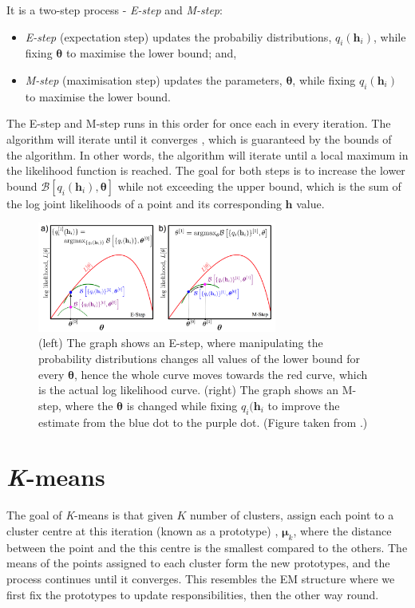 \documentclass[11pt,openright,a4paper]{article}
\numberwithin{equation}{section}
\begin{document}
It is a two-step process - \textit{E-step} and \textit{M-step}:
\begin{itemize}
    \item \textit{E-step} (expectation step) updates the probabiliy distributions, $q_{i}\left(\boldsymbol{h}_{i} \right)$, while fixing $\boldsymbol{\theta}$ to maximise the lower bound; and,
    \item \textit{M-step} (maximisation step) updates the parameters, $\boldsymbol{\theta}$, while fixing $q_{i}\left(\boldsymbol{h}_{i} \right)$ to maximise the lower bound. 
\end{itemize}

The E-step and M-step runs in this order for once each in every iteration. The algorithm will iterate until it converges , which is guaranteed by the bounds of the algorithm. In other words, the algorithm will iterate until a local maximum in the likelihood function is reached. The goal for both steps is to increase the lower bound $\mathcal{B}\left[q_{i}\left(\boldsymbol{h}_i\right),\boldsymbol{\theta} \right]$ while not exceeding the upper bound, which is the sum of the log joint likelihoods of a point and its corresponding $\boldsymbol{h}$ value. 


\begin{figure}[H]
  \centering
  \includegraphics[width=0.7\textwidth]{em-overview}
    \caption{(left) The graph shows an E-step, where manipulating the probability distributions changes all values of the lower bound for every $\boldsymbol{\theta}$, hence the whole curve moves towards the red curve, which is the actual log likelihood curve. (right) The graph shows an M-step, where the $\boldsymbol{\theta}$ is changed while fixing $q_{i}(\boldsymbol{h}_{i}$ to improve the estimate from the blue dot to the purple dot. (Figure taken from \cite{prince}.)}
  \label{fig:em-overview}
\end{figure} 


\section{\textit{K}-means} \label{sec:km}
The goal of \textit{K}-means is that given $K$ number of clusters, assign each point to a cluster centre at this iteration (known as a prototype) , $\boldsymbol{\mu}_k$, where the distance between the point and the this centre is the smallest compared to the others. The means of the points assigned to each cluster form the new prototypes, and the process continues until it converges. This resembles the EM structure where we first fix the prototypes to update responsibilities, then the other way round.
\end{document}
